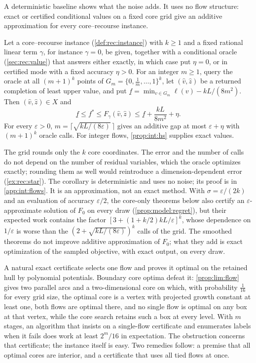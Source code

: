 A deterministic baseline shows what the noise adds. It uses no flow
structure: exact or certified conditional values on a fixed core grid give
an additive approximation for every core--recourse instance.

\begin{corollary}\label{cor:int:grid}
Let a core--recourse instance (\cref{def:rec:instance}) with $k\ge1$ and a
fixed rational linear term $\gamma$, for instance $\gamma=0$, be given,
together with a conditional oracle (\cref{sec:rec:value}) that answers
either exactly, in which case put $\eta=0$, or in certified mode with a fixed
accuracy $\eta>0$. For an integer $m\ge1$, query the oracle at all $(m+1)^k$
points of $G_m=\{0,\frac1m,\ldots,1\}^k$, let $(\hat v,\hat z)$ be a returned
completion of least upper value, and put
$\underline f=\min_{v\in G_m}\ell(v)-kL/(8m^2)$. Then $(\hat v,\hat z)\in X$
and
\[
 \underline f\le f^*\le F_\gamma(\hat v,\hat z)
 \le\underline f+\frac{kL}{8m^2}+\eta .
\]
For every $\varepsilon>0$, $m=\lceil\sqrt{kL/(8\varepsilon)}\,\rceil$ gives an additive
gap at most $\varepsilon+\eta$ with $(m+1)^k$ oracle calls. For integer
flows, \cref{prop:int:hs} supplies exact values.
\end{corollary}

The grid rounds only the $k$ core coordinates. The error and the number of
calls do not depend on the number of residual variables, which the oracle
optimizes exactly; rounding them as well would reintroduce a
dimension-dependent error (\cref{ex:rec:star}). The corollary is
deterministic and uses no noise; its proof is in \cref{app:int:flows}. It is
an approximation, not an exact method. With $\sigma=\varepsilon/(2k)$ and an
evaluation of accuracy $\varepsilon/2$, the core-only theorems below also
certify an $\varepsilon$-approximate solution of $F_0$ on every draw
(\cref{prop:model:regret}), but their expected work contains the factor
$[3+(1+k/2)kL/\varepsilon]^k$, whose dependence on $1/\varepsilon$ is worse
than the $(2+\sqrt{kL/(8\varepsilon)})^k$ calls of the grid. The smoothed theorems do not improve additive approximation of
$F_0$; what they add is exact optimization of the sampled objective, with
exact output, on every draw.

A natural exact certificate selects one flow and proves it optimal on the
retained hull by polynomial potentials. Boundary core optima defeat it:
\cref{prop:lim:flow} gives two parallel arcs and a two-dimensional core on
which, with probability $\frac1{16}$ for every grid size, the optimal core
is a vertex with projected growth constant at least one, both flows are
optimal there, and no single flow is optimal on any box at that vertex,
while the core search retains such a box at every level. With $m$ stages,
an algorithm that insists on a single-flow certificate and enumerates
labels when it fails does work at least $2^m/16$ in expectation. The
obstruction concerns that certificate; the instance itself is easy. Two
remedies follow: a premise that all optimal cores are interior, and a
certificate that uses all tied flows at once.

